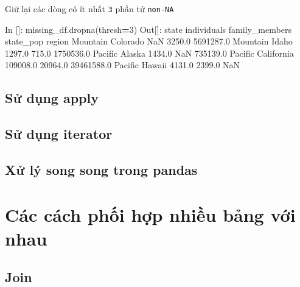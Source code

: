 \documentclass[
]{book}
\newenvironment{Shaded}{\begin{snugshade}}{\end{snugshade}}
\newcommand{\DecValTok}[1]{\textcolor[rgb]{0.00,0.00,0.81}{#1}}
\newcommand{\FloatTok}[1]{\textcolor[rgb]{0.00,0.00,0.81}{#1}}
\newcommand{\NormalTok}[1]{#1}
\newcommand{\OperatorTok}[1]{\textcolor[rgb]{0.81,0.36,0.00}{\textbf{#1}}}
\begin{document}
Giữ lại các dòng có ít nhất \texttt{3} phần tử \texttt{non-NA}

\begin{Shaded}
\begin{Highlighting}[]
\NormalTok{In []: missing\_df.dropna(thresh}\OperatorTok{=}\DecValTok{3}\NormalTok{)}
\NormalTok{Out[]: }
\NormalTok{               state  individuals  family\_members   state\_pop}
\NormalTok{region                                                       }
\NormalTok{Mountain    Colorado          NaN          }\FloatTok{3250.0}   \FloatTok{5691287.0}
\NormalTok{Mountain       Idaho       }\FloatTok{1297.0}           \FloatTok{715.0}   \FloatTok{1750536.0}
\NormalTok{Pacific       Alaska       }\FloatTok{1434.0}\NormalTok{             NaN    }\FloatTok{735139.0}
\NormalTok{Pacific   California     }\FloatTok{109008.0}         \FloatTok{20964.0}  \FloatTok{39461588.0}
\NormalTok{Pacific       Hawaii       }\FloatTok{4131.0}          \FloatTok{2399.0}\NormalTok{         NaN}
\end{Highlighting}
\end{Shaded}

\hypertarget{sux1eed-dux1ee5ng-apply}{%
\section{Sử dụng apply}\label{sux1eed-dux1ee5ng-apply}}

\hypertarget{sux1eed-dux1ee5ng-iterator}{%
\section{Sử dụng iterator}\label{sux1eed-dux1ee5ng-iterator}}

\hypertarget{xux1eed-luxfd-song-song-trong-pandas}{%
\section{Xử lý song song trong pandas}\label{xux1eed-luxfd-song-song-trong-pandas}}

\hypertarget{cuxe1c-cuxe1ch-phux1ed1i-hux1ee3p-nhiux1ec1u-bux1ea3ng-vux1edbi-nhau}{%
\chapter{Các cách phối hợp nhiều bảng với nhau}\label{cuxe1c-cuxe1ch-phux1ed1i-hux1ee3p-nhiux1ec1u-bux1ea3ng-vux1edbi-nhau}}

\hypertarget{join}{%
\section{Join}\label{join}}
\end{document}

